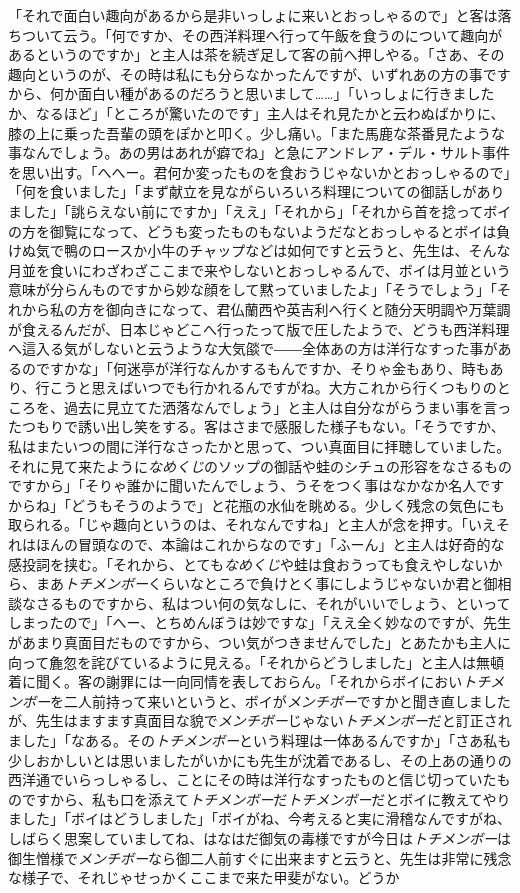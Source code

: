 \documentclass[12pt, openright]{book}
\begin{document}
「それで面白い趣向があるから是非いっしょに来いとおっしゃるので」と客は落ちついて云う。「何ですか、その西洋料理へ行って午飯を食うのについて趣向があるというのですか」と主人は茶を続ぎ足して客の前へ押しやる。「さあ、その趣向というのが、その時は私にも分らなかったんですが、いずれあの方の事ですから、何か面白い種があるのだろうと思いまして\ldots{}\ldots{}」「いっしょに行きましたか、なるほど」「ところが驚いたのです」主人はそれ見たかと云わぬばかりに、膝の上に乗った吾輩の頭をぽかと叩く。少し痛い。「また馬鹿な茶番見たような事なんでしょう。あの男はあれが癖でね」と急にアンドレア・デル・サルト事件を思い出す。「へへー。君何か変ったものを食おうじゃないかとおっしゃるので」「何を食いました」「まず献立を見ながらいろいろ料理についての御話しがありました」「誂らえない前にですか」「ええ」「それから」「それから首を捻ってボイの方を御覧になって、どうも変ったものもないようだなとおっしゃるとボイは負けぬ気で鴨のロースか小牛のチャップなどは如何ですと云うと、先生は、そんな月並を食いにわざわざここまで来やしないとおっしゃるんで、ボイは月並という意味が分らんものですから妙な顔をして黙っていましたよ」「そうでしょう」「それから私の方を御向きになって、君仏蘭西や英吉利へ行くと随分天明調や万葉調が食えるんだが、日本じゃどこへ行ったって版で圧したようで、どうも西洋料理へ這入る気がしないと云うような大気燄で――全体あの方は洋行なすった事があるのですかな」「何迷亭が洋行なんかするもんですか、そりゃ金もあり、時もあり、行こうと思えばいつでも行かれるんですがね。大方これから行くつもりのところを、過去に見立てた洒落なんでしょう」と主人は自分ながらうまい事を言ったつもりで誘い出し笑をする。客はさまで感服した様子もない。「そうですか、私はまたいつの間に洋行なさったかと思って、つい真面目に拝聴していました。それに見て来たように\emph{なめくじ}のソップの御話や蛙のシチュの形容をなさるものですから」「そりゃ誰かに聞いたんでしょう、うそをつく事はなかなか名人ですからね」「どうもそうのようで」と花瓶の水仙を眺める。少しく残念の気色にも取られる。「じゃ趣向というのは、それなんですね」と主人が念を押す。「いえそれはほんの冒頭なので、本論はこれからなのです」「ふーん」と主人は好奇的な感投詞を挟む。「それから、とても\emph{なめくじ}や蛙は食おうっても食えやしないから、まあ\emph{トチメンボー}くらいなところで負けとく事にしようじゃないか君と御相談なさるものですから、私はつい何の気なしに、それがいいでしょう、といってしまったので」「へー、とちめんぼうは妙ですな」「ええ全く妙なのですが、先生があまり真面目だものですから、つい気がつきませんでした」とあたかも主人に向って麁忽を詫びているように見える。「それからどうしました」と主人は無頓着に聞く。客の謝罪には一向同情を表しておらん。「それからボイにおい\emph{トチメンボー}を二人前持って来いというと、ボイが\emph{メンチボー}ですかと聞き直しましたが、先生はますます真面目な貌で\emph{メンチボー}じゃない\emph{トチメンボー}だと訂正されました」「なある。その\emph{トチメンボー}という料理は一体あるんですか」「さあ私も少しおかしいとは思いましたがいかにも先生が沈着であるし、その上あの通りの西洋通でいらっしゃるし、ことにその時は洋行なすったものと信じ切っていたものですから、私も口を添えて\emph{トチメンボー}だ\emph{トチメンボー}だとボイに教えてやりました」「ボイはどうしました」「ボイがね、今考えると実に滑稽なんですがね、しばらく思案していましてね、はなはだ御気の毒様ですが今日は\emph{トチメンボー}は御生憎様で\emph{メンチボー}なら御二人前すぐに出来ますと云うと、先生は非常に残念な様子で、それじゃせっかくここまで来た甲斐がない。どうか\
\end{document}
